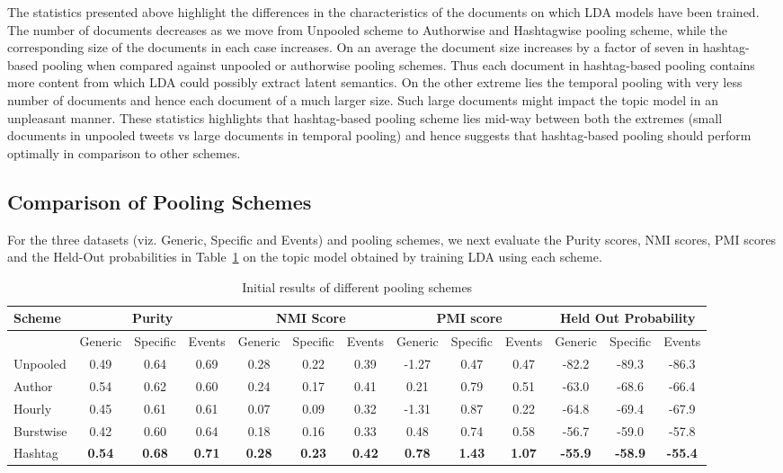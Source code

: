 \documentclass{sig-alternate}
\begin{document}
The statistics presented above highlight the differences in the
characteristics of the documents on which LDA models have been
trained. The number of documents decreases as we move from Unpooled
scheme to Authorwise and Hashtagwise pooling scheme, while the
corresponding size of the documents in each case increases. On an
average the document size increases by a factor of seven in hashtag-based
pooling when compared against unpooled or authorwise pooling
schemes. Thus each document in hashtag-based pooling contains more
content from which LDA could possibly extract latent semantics. On the
other extreme lies the temporal pooling with very less number of
documents and hence each document of a much larger size. Such large
documents might impact the topic model in an unpleasant manner. These
statistics highlights that hashtag-based pooling scheme lies mid-way
between both the extremes (small documents in unpooled tweets vs large
documents in temporal pooling) and hence suggests that hashtag-based
pooling should perform optimally in comparison to other schemes.

\subsection{Comparison of Pooling Schemes}

For the three datasets (viz. Generic, Specific and Events) and pooling
schemes, we next evaluate the Purity scores, NMI scores, PMI scores and the Held-Out probabilities
in Table~\ref{tbl-456} on the topic model obtained by training LDA
using each scheme.

\begin{table}[!ht]
\centering
\resizebox{17cm}{!} 
{
	\begin{tabular}{|l|ccc|ccc|ccc|ccc|}
	\hline
	Scheme  & \multicolumn {3}{c|}{Purity} & \multicolumn {3}{c|}{NMI Score} & \multicolumn {3}{c|}{PMI score} & \multicolumn {3}{c|}{Held Out Probability}\\
	\hline
	 & Generic & Specific & Events &  Generic & Specific & Events &  Generic & Specific & Events & Generic & Specific & Events\\
	\hline
	Unpooled & 0.49 & 0.64 & 0.69 & 0.28 & 0.22 & 0.39 & -1.27 & 0.47 & 0.47 & -82.2 & -89.3 & -86.3\\
	\hline
	Author & 0.54 & 0.62 & 0.60 & 0.24 & 0.17 & 0.41 & 0.21 & 0.79 & 0.51 &-63.0 & -68.6 & -66.4\\
	\hline
	Hourly & 0.45 & 0.61 & 0.61 & 0.07 & 0.09 & 0.32 & -1.31 & 0.87 & 0.22 & -64.8 & -69.4 & -67.9\\
	\hline
	Burstwise & 0.42 & 0.60 & 0.64 & 0.18 & 0.16 & 0.33 & 0.48 & 0.74 & 0.58 & -56.7 & -59.0 & -57.8\\
	\hline
	Hashtag & \textbf{0.54} & \textbf{0.68} & \textbf{0.71} & \textbf{0.28} & \textbf{0.23} & \textbf{0.42} & \textbf{0.78} & \textbf{1.43} & \textbf{1.07} & \textbf{-55.9} & \textbf{-58.9} & \textbf{-55.4}\\
	\hline
	\end{tabular}
}
\caption{Initial results of different pooling schemes}\label{tbl-456}
\end{table}
\end{document}
